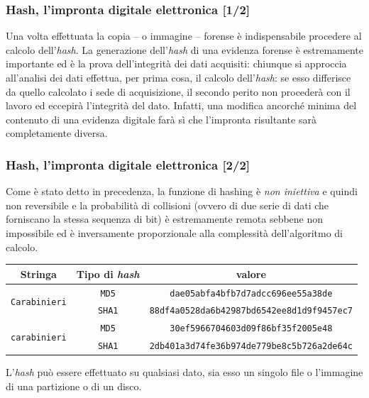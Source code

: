 \documentclass[11pt]{beamer}
\begin{document}
	\begin{frame}
		\frametitle{Hash, l'impronta digitale elettronica [1/2]}
		Una volta effettuata la copia -- o immagine -- forense è indispensabile procedere al calcolo dell'\textit{hash}.
		\vfill
		La generazione dell'\textit{hash} di una evidenza forense è estremamente importante ed è la prova dell'integrità dei dati acquisiti: chiunque si approccia all'analisi dei dati effettua, per prima cosa, il calcolo dell'\textit{hash}: se esso differisce da quello calcolato i sede di acquisizione, il secondo perito non procederà con il lavoro ed eccepirà l'integrità del dato. Infatti, una modifica ancorché minima del contenuto di una evidenza digitale farà sì che l'impronta risultante sarà completamente diversa.
	\end{frame}
	
	\begin{frame}
		\frametitle{Hash, l'impronta digitale elettronica [2/2]}
		
		Come è stato detto in precedenza, la funzione di hashing è \textit{non iniettiva} e quindi non reversibile e la probabilità di collisioni (ovvero di due serie di dati che forniscano la stessa sequenza di bit) è estremamente remota sebbene non impossibile ed è inversamente proporzionale alla complessità dell'algoritmo di calcolo.
		
		
		\begin{table}
			\scriptsize
			\centering
			\begin{tabular}{c|c|c}
				
				Stringa & Tipo di \textit{hash} & valore \\
				\hline
				\multirow{2}{*}{\texttt{Carabinieri}} 
				& \texttt{MD5} & \texttt{dae05abfa4bfb7d7adcc696ee55a38de} \\
				\cline{2-3}
				& \texttt{SHA1} & \texttt{88df4a0528da6b42987bd6542ee8d1d9f9457ec7} \\
				
				\hline
				\multirow{2}{*}{\texttt{carabinieri}}
				& \texttt{MD5} & \texttt{30ef5966704603d09f86bf35f2005e48} \\
				\cline{2-3}
				& \texttt{SHA1} & \texttt{2db401a3d74fe36b974de779be8c5b726a2de64c} \\
			\end{tabular}
			
		\end{table}
		
		L'\textit{hash} può essere effettuato su qualsiasi dato, sia esso un singolo file o l'immagine di una partizione o di un disco.
	\end{frame}
	
\end{document}

